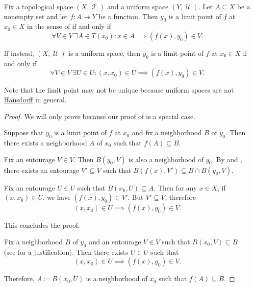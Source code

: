 \begin{proposition}\label{thm:uniform_space_local_convergence}
  Fix a topological space \( (X, \mscrT) \) and a uniform space \( (Y, \mscrU) \). Let \( A \subseteq X \) be a nonempty set and let \( f: A \to Y \) be a function. Then \( y_0 \) is a limit point of \( f \) at \( x_0 \in X \) in the sense of  if and only if
  \begin{equation}\label{thm:uniform_space_local_convergence/topological_source}
    \forall V \in V \ \exists A \in T(x_0) : x \in A \implies (f(x), y_0) \in V.
  \end{equation}

  If instead, \( (X, \mscrU) \) is a uniform space, then \( y_0 \) is a limit point of \( f \) at \( x_0 \in X \) if and only if
  \begin{equation}\label{thm:uniform_space_local_convergence/uniform_source}
    \forall V \in V \ \exists U \in U : (x, x_0) \in U \implies (f(x), y_0) \in V.
  \end{equation}

  Note that the limit point may not be unique because uniform spaces are not \hyperref[def:separation_axioms/T2]{Hausdorff} in general.
\end{proposition}
\begin{proof}
  We will only prove  because our proof of  is a special case.

  \SufficiencySubProof Suppose that \( y_0 \) is a limit point of \( f \) at \( x_0 \) and fix a neighborhood \( B \) of \( y_0 \). Then there exists a neighborhood \( A \) of \( x_0 \) such that \( f(A) \subseteq B \).

  Fix an entourage \( V \in V \). Then \( B(y_0, V) \) is also a neighborhood of \( y_0 \). By  and , there exists an entourage \( V' \subseteq V \) such that \( B(f(x), V') \subseteq B \cap B(y_0, V) \).

  Fix an entourage \( U \in U \) such that \( B(x_0, U) \subseteq A \). Then for any \( x \in X \), if \( (x, x_0) \in U \), we have \( (f(x), y_0) \in V' \). But \( V' \subseteq V \), therefore
  \begin{equation*}
    (x, x_0) \in U \implies (f(x), y_0) \in V.
  \end{equation*}

  This concludes the proof.

  \NecessitySubProof Fix a neighborhood \( B \) of \( y_0 \) and an entourage \( V \in V \) such that \( B(x_0, V) \subseteq B \) (see  for a justification). Then there exists \( U \in U \) such that
  \begin{equation*}
    (x, x_0) \in U \implies (f(x), y_0) \in V.
  \end{equation*}

  Therefore, \( A \coloneqq B(x_0, U) \) is a neighborhood of \( x_0 \) such that \( f(A) \subseteq B \).
\end{proof}

